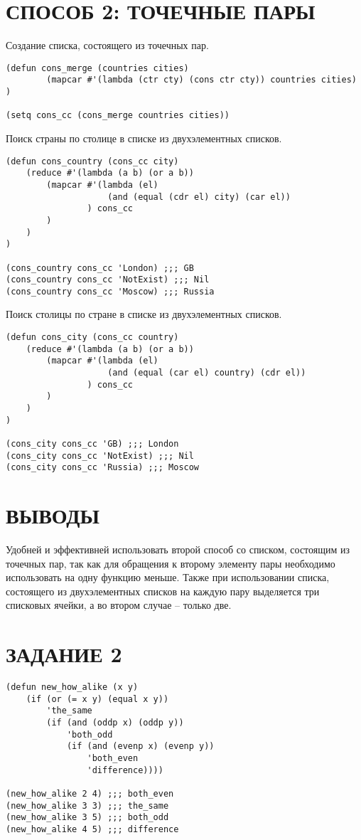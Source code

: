 \section{СПОСОБ 2: ТОЧЕЧНЫЕ ПАРЫ}

Создание списка, состоящего из точечных пар.

\begin{lstlisting}
(defun cons_merge (countries cities)
        (mapcar #'(lambda (ctr cty) (cons ctr cty)) countries cities)
)

(setq cons_cc (cons_merge countries cities))
\end{lstlisting}

Поиск страны по столице в списке из двухэлементных списков.

\begin{lstlisting}
(defun cons_country (cons_cc city)
    (reduce #'(lambda (a b) (or a b))
        (mapcar #'(lambda (el)
                    (and (equal (cdr el) city) (car el))
                ) cons_cc
        )
    )
)

(cons_country cons_cc 'London) ;;; GB
(cons_country cons_cc 'NotExist) ;;; Nil
(cons_country cons_cc 'Moscow) ;;; Russia
\end{lstlisting}

Поиск столицы по стране в списке из двухэлементных списков.

\begin{lstlisting}
(defun cons_city (cons_cc country)
    (reduce #'(lambda (a b) (or a b))
        (mapcar #'(lambda (el)
                    (and (equal (car el) country) (cdr el))
                ) cons_cc
        )
    )
)

(cons_city cons_cc 'GB) ;;; London
(cons_city cons_cc 'NotExist) ;;; Nil
(cons_city cons_cc 'Russia) ;;; Moscow
\end{lstlisting}

\section{ВЫВОДЫ}

Удобней и эффективней использовать второй способ со списком,
состоящим из точечных пар, так как для обращения к второму
элементу пары необходимо использовать на одну функцию меньше.
Также при использовании списка, состоящего из двухэлементных списков
на каждую пару выделяется три списковых ячейки, а во втором случае --
только две.

\section{ЗАДАНИЕ 2}

\begin{lstlisting}
(defun new_how_alike (x y)
    (if (or (= x y) (equal x y))
        'the_same
        (if (and (oddp x) (oddp y))
            'both_odd
            (if (and (evenp x) (evenp y))
                'both_even
                'difference))))

(new_how_alike 2 4) ;;; both_even
(new_how_alike 3 3) ;;; the_same
(new_how_alike 3 5) ;;; both_odd
(new_how_alike 4 5) ;;; difference
\end{lstlisting}
